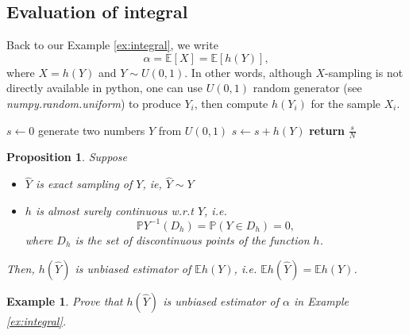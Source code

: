 \documentclass{article}
\newtheorem{proposition}[theorem]{Proposition}
\newtheorem{example}{Example}
\begin{document}
\subsection{Evaluation of integral}
Back to our Example \ref{ex:integral}, we write
$$\alpha = \mathbb E[X] = \mathbb E[h(Y)],$$
where $X = h(Y)$ and $Y\sim U(0,1)$.
In other words, although $X$-sampling is not directly available in python, 
one can use $U(0,1)$ random generator (see {\it numpy.random.uniform}) to produce $Y_i$, then compute $h(Y_i)$ for 
the sample $X_i$.


\begin{algorithm}
\caption{Integral by MC - Example \ref{ex:integral}}
\label{alg:mcpi}
\begin{algorithmic}[1]
\State  $s \gets 0$ 
	\State generate two numbers $Y$ from $U(0,1)$ 
	\State $s\gets s+h(Y)$ 
\EndFor
\State \textbf{return} $\frac{s}{N}$ 
\EndProcedure
\end{algorithmic}
\end{algorithm}


\begin{proposition}
 \label{ex:conv1}
 Suppose 
\begin{itemize}
 \item  $\hat Y$ is exact sampling of $Y$, ie, $\hat Y \sim Y$ 
 \item $h$ is almost surely continuous w.r.t $Y$, i.e. $$\mathbb P Y^{-1} (D_{h}) = \mathbb P(Y\in D_{h}) = 0,$$
 where $D_{h}$ is the set of discontinuous points of the function $h$.
\end{itemize}
Then, $h(\hat Y) $ is unbiased estimator of $\mathbb Eh(Y)$, i.e. 
$\mathbb E h(\hat Y) = \mathbb E h(Y)$.
\end{proposition}

\begin{example}
 Prove that $h(\hat Y)$ is unbiased estimator of $\alpha$ in Example \ref{ex:integral}.
\end{example}
\end{document}
